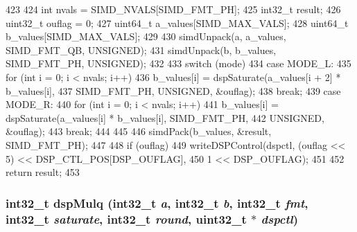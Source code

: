\begin{DoxyCode}
423 {
424     int nvals = SIMD_NVALS[SIMD_FMT_PH];
425     int32_t result;
426     uint32_t ouflag = 0;
427     uint64_t a_values[SIMD_MAX_VALS];
428     uint64_t b_values[SIMD_MAX_VALS];
429 
430     simdUnpack(a, a_values, SIMD_FMT_QB, UNSIGNED);
431     simdUnpack(b, b_values, SIMD_FMT_PH, UNSIGNED);
432 
433     switch (mode) {
434       case MODE_L:
435         for (int i = 0; i < nvals; i++)
436             b_values[i] = dspSaturate(a_values[i + 2] * b_values[i],
437                                       SIMD_FMT_PH, UNSIGNED, &ouflag);
438         break;
439       case MODE_R:
440         for (int i = 0; i < nvals; i++)
441             b_values[i] = dspSaturate(a_values[i] * b_values[i], SIMD_FMT_PH,
442                                       UNSIGNED, &ouflag);
443         break;
444     }
445 
446     simdPack(b_values, &result, SIMD_FMT_PH);
447 
448     if (ouflag)
449         writeDSPControl(dspctl, (ouflag << 5) << DSP_CTL_POS[DSP_OUFLAG],
450                         1 << DSP_OUFLAG);
451 
452     return result;
453 }
\end{DoxyCode}
\hypertarget{namespaceMipsISA_a3006e33638ef226180920245f581d7a2}{
\subsubsection[{dspMulq}]{\setlength{\rightskip}{0pt plus 5cm}int32\_\-t dspMulq (int32\_\-t {\em a}, \/  int32\_\-t {\em b}, \/  int32\_\-t {\em fmt}, \/  int32\_\-t {\em saturate}, \/  int32\_\-t {\em round}, \/  {\bf uint32\_\-t} $\ast$ {\em dspctl})}}
\label{namespaceMipsISA_a3006e33638ef226180920245f581d7a2}



